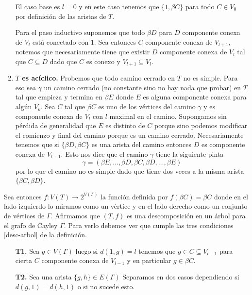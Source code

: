 \documentclass[tesis.tex]{subfiles}
\begin{document}
\begin{ej}
\begin{enumerate}[$\bullet$]
		El caso base es $l = 0$ y en este caso tenemos que $\{ 1, \beta C  \}$ para todo $C \in V_{0}$ por definición de las aristas de $T$.
		
		Para el paso inductivo suponemos que todo $\beta D$ para $D$ componente conexa de $V_{l}$ está conectado con $1$.
		Sea entonces $C$ componente conexa de $V_{l+1}$, notemos que necesariamente tiene que existir $D$ componente conexa de $V_{l}$ tal que $C \subseteq D$ dado que $C$ es conexo y $V_{l+1} \subseteq V_{l}$.
		
		\item \textbf{$T$ es acíclico.}
		Probemos que todo camino cerrado en $T$ no es simple.
		Para eso sea $\gamma$ un camino cerrado (no constante sino no hay nada que probar) en $T$ tal que empieza y termina en $\beta E$ donde $E$ es alguna componente conexa para algún $V_{k}$.
		Sea $C$ tal que $\beta C$ es uno de los vértices del camino $\gamma$ y es componente conexa de $V_{l}$ con $l$ maximal en el camino.
		Supongamos sin pérdida de generalidad que $E$ es distinto de $C$ porque sino podemos modificar el comienzo y final del camino porque es un camino cerrado.
		Necesariamente tenemos que si $\{ \beta D, \beta C \}$ es una arista del camino entonces $D$ es componente conexa de $V_{l-1}$.
		Esto nos dice que el camino $\gamma$ tiene la siguiente pinta
		\[
			\gamma = (\beta E, \dots, \beta D, \beta C, \beta D, \dots, \beta E)
		\]
		por lo que el camino no es simple dado que tiene dos veces a la misma arista $\{ \beta C, \beta D \}$.
		
	\end{enumerate}
	  
	Sea entonces $f: V(T) \to 2^{V(\Gamma)}$ la función definida por $f(\beta C) = \beta C$ donde en el lado izquierdo lo miramos como un vértice y en el lado derecho como un conjunto de vértices de $\Gamma$.
	Afirmamos que $(T,f)$ es una descomposición en un árbol para el grafo de Cayley $\Gamma$.
	Para verlo debemos ver que cumple las tres condiciones \ref{desc-arbol} de la definición. 
	\begin{enumerate}
		\item[\textbf{T1.}] Sea $g \in V(\Gamma)$ luego si $d(1,g) = l$
		tenemos que $g \in C \subseteq V_{l-1}$ para cierta $C$ componente conexa de $V_{l-1}$ y en particular $g \in \beta C$.		 
		
		
		\item[\textbf{T2.}] Sea una arista $\{g,h\} \in E(\Gamma)$ 
		Separamos en dos casos dependiendo si $d(g,1) = d(h,1)$ o si no sucede esto.
		

\end{enumerate}
\end{ej}
\end{document}
